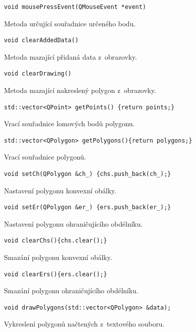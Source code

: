 \documentclass[a4paper, 12pt, oneside, titlepage]{article} %
\begin{document}
\begin{verbatim}
void mousePressEvent(QMouseEvent *event)
\end{verbatim}
Metoda určující souřadnice určeného bodu.\\

\begin{verbatim}
void clearAddedData()
\end{verbatim}
Metoda mazající přidaná data z~obrazovky.\\

\begin{verbatim}
void clearDrawing()
\end{verbatim}
Metoda mazající nakreslený polygon z~obrazovky.\\

\begin{verbatim}
std::vector<QPoint> getPoints() {return points;}
\end{verbatim}
Vrací souřadnice lomových bodů polygonu.\\

\begin{verbatim}
std::vector<QPolygon> getPolygons(){return polygons;}
\end{verbatim}
Vrací souřadnice polygonů.\\

\begin{verbatim}
void setCh(QPolygon &ch_) {chs.push_back(ch_);}
\end{verbatim}
Nastavení polygonu konvexní obálky.\\

\begin{verbatim}
void setEr(QPolygon &er_) {ers.push_back(er_);}
\end{verbatim}
Nastavení polygonu ohraničujícího obdélníku.\\

\begin{verbatim}
void clearChs(){chs.clear();}
\end{verbatim}
Smazání polygonu konvexní obálky.\\

\begin{verbatim}
void clearErs(){ers.clear();}
\end{verbatim}
Smazání polygonu ohraničujícího obdélníku.\\

\begin{verbatim}
void drawPolygons(std::vector<QPolygon> &data);
\end{verbatim}
Vykreslení polygonů načtených z~textového souboru.\\
\end{document}
